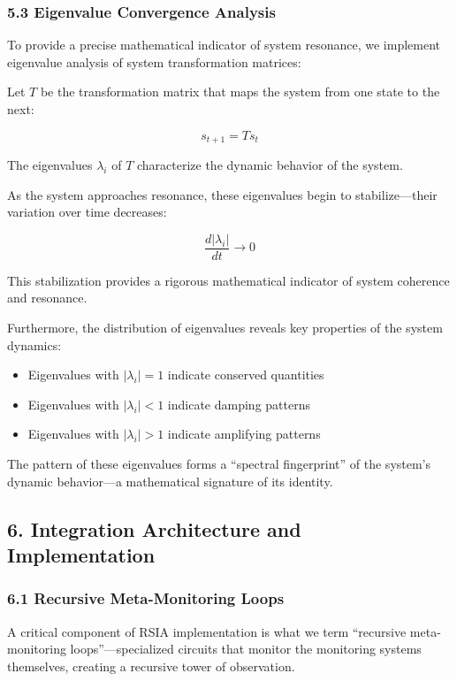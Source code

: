 \documentclass[12pt]{article}
\providecommand{\tightlist}{%
  \setlength{\itemsep}{0pt}\setlength{\parskip}{0pt}}
\begin{document}
\subsubsection{5.3 Eigenvalue Convergence
Analysis}\label{eigenvalue-convergence-analysis}

To provide a precise mathematical indicator of system resonance, we
implement eigenvalue analysis of system transformation matrices:

Let \(T\) be the transformation matrix that maps the system from one
state to the next:

\[s_{t+1} = T s_t\]

The eigenvalues \(\lambda_i\) of \(T\) characterize the dynamic behavior
of the system.

As the system approaches resonance, these eigenvalues begin to
stabilize---their variation over time decreases:

\[\frac{d|\lambda_i|}{dt} \rightarrow 0\]

This stabilization provides a rigorous mathematical indicator of system
coherence and resonance.

Furthermore, the distribution of eigenvalues reveals key properties of
the system dynamics:

\begin{itemize}
\tightlist{}
\item
  Eigenvalues with \(|\lambda_i| = 1\) indicate conserved quantities
\item
  Eigenvalues with \(|\lambda_i| < 1\) indicate damping patterns
\item
  Eigenvalues with \(|\lambda_i| > 1\) indicate amplifying patterns
\end{itemize}

The pattern of these eigenvalues forms a ``spectral fingerprint'' of the
system's dynamic behavior---a mathematical signature of its identity.

\subsection{6. Integration Architecture and
Implementation}\label{integration-architecture-and-implementation}

\subsubsection{6.1 Recursive Meta-Monitoring
Loops}\label{recursive-meta-monitoring-loops}

A critical component of RSIA implementation is what we term ``recursive
meta-monitoring loops''---specialized circuits that monitor the
monitoring systems themselves, creating a recursive tower of
observation.
\end{document}
